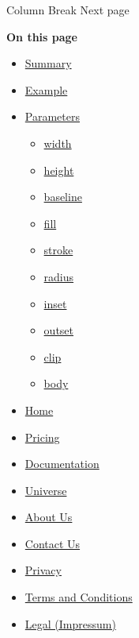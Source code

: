 { Column Break } { Next page }

\textbf{On this page}

\begin{itemize}
\tightlist
\item
  \hyperref[summary]{Summary}
\item
  \hyperref[example]{Example}
\item
  \hyperref[parameters]{Parameters}

  \begin{itemize}
  \tightlist
  \item
    \hyperref[parameters-width]{width}
  \item
    \hyperref[parameters-height]{height}
  \item
    \hyperref[parameters-baseline]{baseline}
  \item
    \hyperref[parameters-fill]{fill}
  \item
    \hyperref[parameters-stroke]{stroke}
  \item
    \hyperref[parameters-radius]{radius}
  \item
    \hyperref[parameters-inset]{inset}
  \item
    \hyperref[parameters-outset]{outset}
  \item
    \hyperref[parameters-clip]{clip}
  \item
    \hyperref[parameters-body]{body}
  \end{itemize}
\end{itemize}

\begin{itemize}
\tightlist
\item
  \href{/}{Home}
\item
  \href{/pricing/}{Pricing}
\item
  \href{/docs/}{Documentation}
\item
  \href{/universe/}{Universe}
\item
  \href{/about/}{About Us}
\item
  \href{/contact/}{Contact Us}
\item
  \href{/privacy/}{Privacy}
\item
  \href{https://typst.app/terms}{Terms and Conditions}
\item
  \href{/legal/}{Legal (Impressum)}
\end{itemize}

